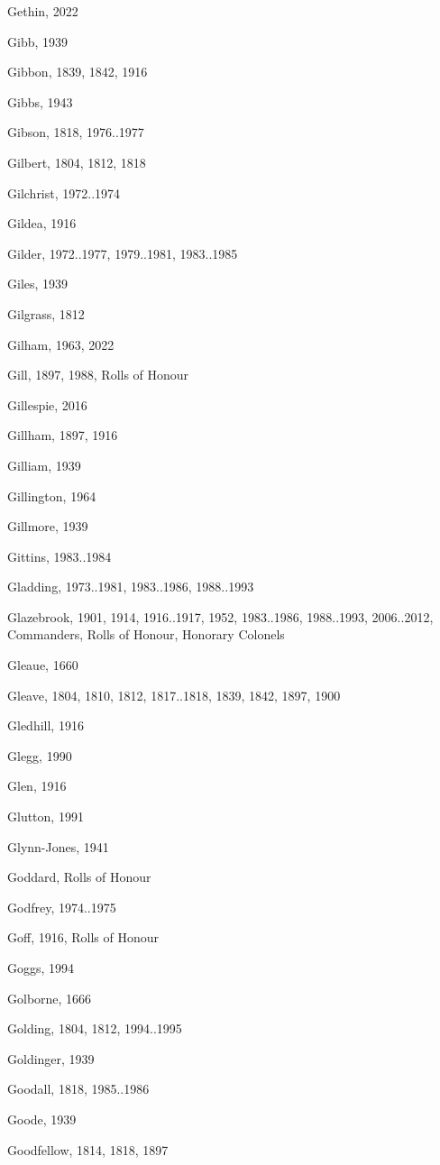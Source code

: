\begin{theindex}
\item Gethin, 2022
\item Gibb, 1939
\item Gibbon, 1839, 1842, 1916
\item Gibbs, 1943
\item Gibson, 1818, 1976..1977
\item Gilbert, 1804, 1812, 1818
\item Gilchrist, 1972..1974
\item Gildea, 1916
\item Gilder, 1972..1977, 1979..1981, 1983..1985
\item Giles, 1939
\item Gilgrass, 1812
\item Gilham, 1963, 2022
\item Gill, 1897, 1988, Rolls of Honour
\item Gillespie, 2016
\item Gillham, 1897, 1916
\item Gilliam, 1939
\item Gillington, 1964
\item Gillmore, 1939
\item Gittins, 1983..1984
\item Gladding, 1973..1981, 1983..1986, 1988..1993
\item Glazebrook, 1901, 1914, 1916..1917, 1952, 1983..1986, 1988..1993, 2006..2012, Commanders, Rolls of Honour, Honorary Colonels
\item Gleaue, 1660
\item Gleave, 1804, 1810, 1812, 1817..1818, 1839, 1842, 1897, 1900
\item Gledhill, 1916
\item Glegg, 1990
\item Glen, 1916
\item Glutton, 1991
\item Glynn-Jones, 1941
\item Goddard, Rolls of Honour
\item Godfrey, 1974..1975
\item Goff, 1916, Rolls of Honour
\item Goggs, 1994
\item Golborne, 1666
\item Golding, 1804, 1812, 1994..1995
\item Goldinger, 1939
\item Goodall, 1818, 1985..1986
\item Goode, 1939
\item Goodfellow, 1814, 1818, 1897

\end{theindex}
